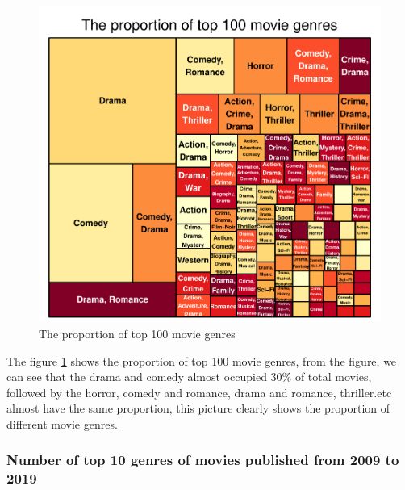 \documentclass[11pt,a4paper,]{article}
\begin{document}
\begin{figure}
\centering
\includegraphics{Report_files/figure-latex/genres-1.pdf}
\caption{\label{fig:genres}The proportion of top 100 movie genres}
\end{figure}

The figure \ref{fig:genres} shows the proportion of top 100 movie genres, from the figure, we can see that the drama and comedy almost occupied 30\% of total movies, followed by the horror, comedy and romance, drama and romance, thriller.etc almost have the same proportion, this picture clearly shows the proportion of different movie genres.

\hypertarget{number-of-top-10-genres-of-movies-published-from-2009-to-2019}{%
\subsubsection{Number of top 10 genres of movies published from 2009 to 2019}\label{number-of-top-10-genres-of-movies-published-from-2009-to-2019}}
\end{document}

